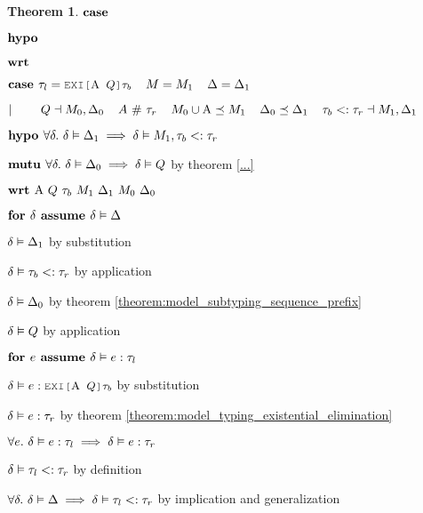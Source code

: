 \documentclass[acmsmall]{acmart}
\theoremstyle{definition}
\newtheorem{theorem}{Theorem}[section]
\begin{document}
\begin{theorem}
    \item \Z $\textbf{case } $
    \item \Z $\textbf{hypo } $
    \item \Z $\textbf{wrt } $
      \item \Z\Z {} 

    \item \Z $\B{case } 
      \tau_l = \J{EXI[$\Alpha$ $Q$]$\tau_b$}
      \I
      M = M_1
      \I
      \Delta = \Delta_1
    $
    \item \Z $|\ \ \ \ \ \ \ 
      Q \dashv M_0, \Delta_0
      \hspace{4mm}
      A \ \#\  \tau_r
      \hspace{4mm}
      M_0 \cup \mathrm{A} \preceq M_1
      \hspace{4mm}
      \Delta_0 \preceq \Delta_1
      \hspace{4mm}
      \tau_b <: \tau_r
      \dashv M_1, \Delta_1
    $
    \item \Z $\textbf{hypo } 
      \forall \delta .\ \delta \vDash \Delta_1 \implies \delta \vDash M_1, \tau_b <: \tau_r 
    $
    \item \Z $\textbf{mutu } 
      \forall \delta .\ \delta \vDash \Delta_0 \implies \delta \vDash Q 
    $ by theorem \ref{...} 
    \item \Z $\B{wrt } \Alpha\ Q\ \tau_b\ M_1\ \Delta_1\ M_0\ \Delta_0$
      \item \Z\Z $\textbf{for } \delta \textbf{ assume } \delta \vDash \Delta$
        \item \Z\Z\Z $\delta \vDash \Delta_1 $ by substitution
        \item \Z\Z\Z $\delta \vDash \tau_b <: \tau_r$ by application
        \item \Z\Z\Z $\delta \vDash \Delta_0 $ by theorem \ref{theorem:model_subtyping_sequence_prefix}
        \item \Z\Z\Z $\delta \vDash Q$ by application
        \item \Z\Z\Z $\textbf{for } e \textbf{ assume } \delta \vDash e : \tau_l$ 
          \item \Z\Z\Z\Z $\delta \satisfies e \hastype \J{EXI[$\Alpha$ $Q$]$\tau_b$}$ by substitution
          \item \Z\Z\Z\Z $\delta \vDash e : \tau_r$ by theorem \ref{theorem:model_typing_existential_elimination} 
        \item \Z\Z\Z $\forall e .\ \delta \vDash e : \tau_l 
          \implies \delta \vDash e : \tau_r
        $ 
        \item \Z\Z\Z $\delta \vDash \tau_l <: \tau_r$ by definition 
      \item \Z\Z $\forall \delta .\ \delta \vDash \Delta \implies \delta \vDash \tau_l <: \tau_r$ 
      by implication and generalization


\end{theorem}
\end{document}
